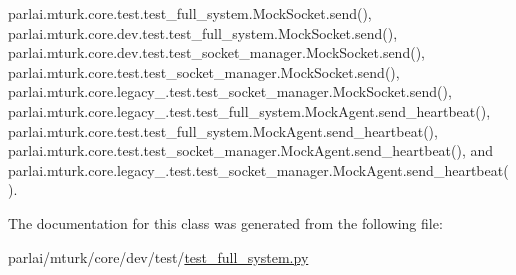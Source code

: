 parlai.\+mturk.\+core.\+test.\+test\+\_\+full\+\_\+system.\+Mock\+Socket.\+send(), parlai.\+mturk.\+core.\+dev.\+test.\+test\+\_\+full\+\_\+system.\+Mock\+Socket.\+send(), parlai.\+mturk.\+core.\+dev.\+test.\+test\+\_\+socket\+\_\+manager.\+Mock\+Socket.\+send(), parlai.\+mturk.\+core.\+test.\+test\+\_\+socket\+\_\+manager.\+Mock\+Socket.\+send(), parlai.\+mturk.\+core.\+legacy\+\_.\+test.\+test\+\_\+socket\+\_\+manager.\+Mock\+Socket.\+send(), parlai.\+mturk.\+core.\+legacy\+\_.\+test.\+test\+\_\+full\+\_\+system.\+Mock\+Agent.\+send\+\_\+heartbeat(), parlai.\+mturk.\+core.\+test.\+test\+\_\+full\+\_\+system.\+Mock\+Agent.\+send\+\_\+heartbeat(), parlai.\+mturk.\+core.\+test.\+test\+\_\+socket\+\_\+manager.\+Mock\+Agent.\+send\+\_\+heartbeat(), and parlai.\+mturk.\+core.\+legacy\+\_.\+test.\+test\+\_\+socket\+\_\+manager.\+Mock\+Agent.\+send\+\_\+heartbeat().



The documentation for this class was generated from the following file\+:\begin{DoxyCompactItemize}
\item 
parlai/mturk/core/dev/test/\hyperlink{dev_2test_2test__full__system_8py}{test\+\_\+full\+\_\+system.\+py}\end{DoxyCompactItemize}
